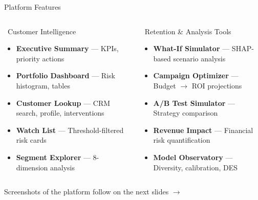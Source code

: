 \documentclass[aspectratio=169,11pt]{beamer}
\begin{document}
\begin{frame}{Platform Features}
  \begin{columns}[T]
    \begin{block}{\ Customer Intelligence}
      \begin{itemize}
        \item \textbf{Executive Summary} — KPIs, priority actions
        \item \textbf{Portfolio Dashboard} — Risk histogram, tables
        \item \textbf{Customer Lookup} — CRM search, profile, interventions
        \item \textbf{Watch List} — Threshold-filtered risk cards
        \item \textbf{Segment Explorer} — 8-dimension analysis
      \end{itemize}
    \end{block}

    \begin{block}{\ Retention \& Analysis Tools}
      \begin{itemize}
        \item \textbf{What-If Simulator} — SHAP-based scenario analysis
        \item \textbf{Campaign Optimizer} — Budget $\rightarrow$ ROI projections
        \item \textbf{A/B Test Simulator} — Strategy comparison
        \item \textbf{Revenue Impact} — Financial risk quantification
        \item \textbf{Model Observatory} — Diversity, calibration, DES
      \end{itemize}
    \end{block}
  \end{columns}

  \vspace{10pt}
  \centering
  {\small\color{subtletext} Screenshots of the platform follow on the next slides $\rightarrow$}
\end{frame}
\end{document}
